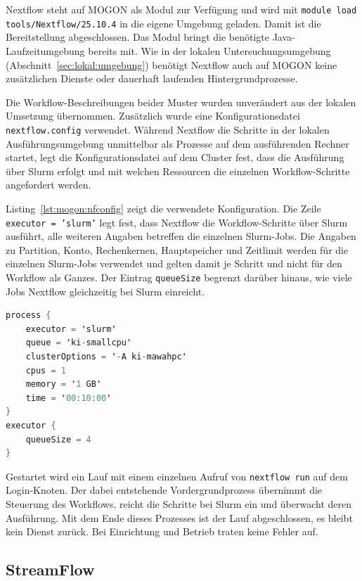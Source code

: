 Nextflow steht auf MOGON als Modul zur Verfügung und wird mit
\texttt{module load tools/Nextflow/25.10.4} in die eigene Umgebung
geladen. Damit ist die Bereitstellung abgeschlossen. Das Modul
bringt die benötigte Java-Laufzeitumgebung bereits mit. Wie in der
lokalen Untersuchungsumgebung
(Abschnitt~\ref{sec:lokal:umgebung}) benötigt Nextflow auch auf
MOGON keine zusätzlichen Dienste oder dauerhaft laufenden
Hintergrundprozesse.

Die Workflow-Beschreibungen beider Muster wurden unverändert aus der lokalen Umsetzung übernommen. Zusätzlich wurde eine Konfigurationsdatei
\texttt{nextflow.config} verwendet.
Während Nextflow die Schritte in der lokalen Ausführungsumgebung unmittelbar als Prozesse auf dem ausführenden Rechner startet, legt die Konfigurationsdatei auf dem Cluster fest, dass die Ausführung über Slurm erfolgt und mit welchen Ressourcen die einzelnen Workflow-Schritte angefordert werden.

Listing~\ref{lst:mogon:nfconfig} zeigt die verwendete
Konfiguration. Die Zeile \texttt{executor = 'slurm'} legt fest, dass Nextflow die Workflow-Schritte über Slurm ausführt, alle weiteren Angaben betreffen die einzelnen Slurm-Jobs. Die Angaben zu Partition,
Konto, Rechenkernen, Hauptspeicher und Zeitlimit werden für die
einzelnen Slurm-Jobs verwendet und gelten damit je Schritt und nicht
für den Workflow als Ganzes. Der Eintrag
\texttt{queueSize} begrenzt darüber hinaus, wie viele Jobs Nextflow
gleichzeitig bei Slurm einreicht. 

\begin{lstlisting}[language=Java,
  caption={Konfiguration von Nextflow für die Ausführung auf MOGON},
  label={lst:mogon:nfconfig}]
process {
    executor = 'slurm'
    queue = 'ki-smallcpu'
    clusterOptions = '-A ki-mawahpc'
    cpus = 1
    memory = '1 GB'
    time = '00:10:00'
}
executor {
    queueSize = 4
}
\end{lstlisting}

Gestartet wird ein Lauf mit einem einzelnen Aufruf von
\texttt{nextflow run} auf dem Login-Knoten. Der dabei entstehende
Vordergrundprozess übernimmt die Steuerung des Workflows, reicht die
Schritte bei Slurm ein und überwacht deren Ausführung. Mit dem Ende
dieses Prozesses ist der Lauf abgeschlossen, es bleibt kein Dienst
zurück. Bei Einrichtung und Betrieb traten keine Fehler auf.


\subsection{StreamFlow}
\label{sec:mogon:streamflow}

